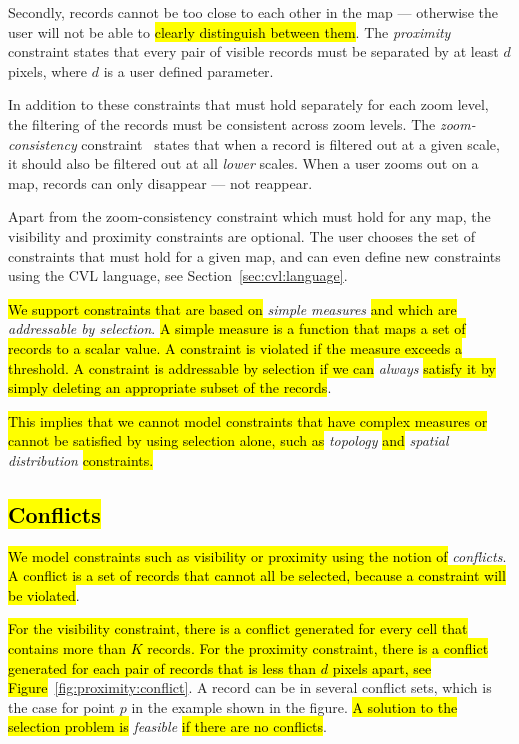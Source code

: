Secondly, records cannot be too close to each other in the map --- otherwise the user will not be able to \hl{clearly distinguish between them}. The \emph{proximity} constraint states that every pair of visible records must be separated by at least $d$ pixels, where $d$ is a user defined parameter.

In addition to these constraints that must hold separately for each zoom level, the filtering of the records must be consistent across zoom levels. The \emph{zoom-consistency} constraint~\cite{sarma2012fusiontables} states that when a record is filtered out at a given scale, it should also be filtered out at all \emph{lower} scales. When a user zooms out on a map, records can only disappear --- not reappear.

Apart from the zoom-consistency constraint which must hold for any map, the visibility and proximity constraints are optional. The user chooses the set of constraints that must hold for a given map, and can even define new constraints using the CVL language, see Section~\ref{sec:cvl:language}.

\hl{We support constraints that are based on }\emph{simple measures}\hl{ and which are }\emph{addressable by selection}.\hl{ A simple measure is a function that maps a set of records to a scalar value. A constraint is violated if the measure exceeds a threshold. A constraint is addressable by selection if we can }\emph{always}\hl{ satisfy it by simply deleting an appropriate subset of the records}.

\hl{This implies that we cannot model constraints that have complex measures or cannot be satisfied by using selection alone, such as }\emph{topology}\hl{ and }\emph{spatial distribution}\hl{ constraints.}

\subsection{\hl{Conflicts}}
\label{sec:conflicts}

\hl{We model constraints such as visibility or proximity using the notion of }\emph{conflicts}. \hl{A conflict is a set of records that cannot all be selected, because a constraint will be violated}.

\hl{For the visibility constraint, there is a conflict generated for every cell that contains more than $K$ records. For the proximity constraint, there is a conflict generated for each pair of records that is less than $d$ pixels apart, see Figure}~\ref{fig:proximity:conflict}. A record can be in several conflict sets, which is the case for point $p$ in the example shown in the figure. \hl{A solution to the selection problem is }\emph{feasible}\hl{ if there are no conflicts}.

